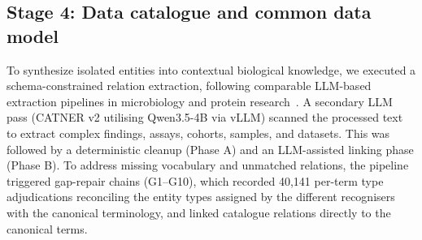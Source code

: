 \documentclass[referee,lineno,pdflatex,sn-vancouver-num]{sn-jnl}
\theoremstyle{thmstyleone}%
\theoremstyle{thmstyletwo}%
\theoremstyle{thmstylethree}%
\begin{document}
\subsection{Stage 4: Data catalogue and common data model}\label{sec:stage4}

To synthesize isolated entities into contextual biological knowledge, we
executed a schema-constrained relation extraction, following comparable
LLM-based extraction pipelines in microbiology and protein
research~\cite{lu2025microllm,chen2026buffers}. A secondary LLM pass
(CATNER v2 utilising Qwen3.5-4B via vLLM) scanned the processed text to
extract complex findings, assays, cohorts, samples, and datasets. This was
followed by a deterministic cleanup (Phase A) and an LLM-assisted linking
phase (Phase B). To address missing vocabulary and unmatched relations, the
pipeline triggered gap-repair chains (G1--G10), which recorded 40,141
per-term type adjudications reconciling the entity types assigned by the
different recognisers with the canonical terminology, and linked catalogue
relations directly to the canonical terms.
\end{document}
